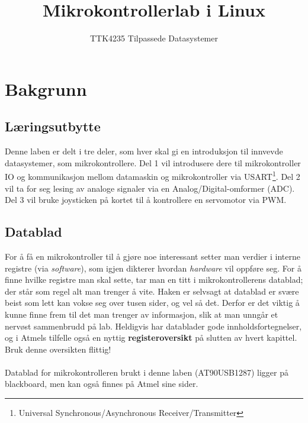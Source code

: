 \documentclass[11pt,a4paper]{article}
\title{Mikrokontrollerlab i Linux}
\author{TTK4235 Tilpassede Datasystemer}
\date{}
\def\e_learn_platform{blackboard}
\begin{document}
\maketitle
\section{Bakgrunn}
\subsection{Læringsutbytte}
Denne laben er delt i tre deler, som hver skal gi en introduksjon til innvevde datasystemer, som mikrokontrollere. Del 1 vil introdusere dere til mikrokontroller IO og kommunikasjon mellom datamaskin og mikrokontroller via USART\footnote{Universal Synchronous/Asynchronous Receiver/Transmitter}. Del 2 vil ta for seg lesing av analoge signaler via en Analog/Digital-omformer (ADC). Del 3 vil bruke joysticken på kortet til å kontrollere en servomotor via PWM.

\subsection{Datablad}
For å få en mikrokontroller til å gjøre noe interessant setter man verdier i interne registre (via \textit{software}), som igjen dikterer hvordan \textit{hardware} vil oppføre seg. For å finne hvilke registre man skal sette, tar man en titt i mikrokontrollerens datablad; der står som regel alt man trenger å vite. Haken er selvsagt at datablad er svære beist som lett kan vokse seg over tusen sider, og vel så det. Derfor er det viktig å kunne finne frem til det man trenger av informasjon, slik at man unngår et nervøst sammenbrudd på lab. Heldigvis har datablader gode innholdsfortegnelser, og i Atmels tilfelle også en nyttig \textbf{registeroversikt} på slutten av hvert kapittel. Bruk denne oversikten flittig!\\
\\
Datablad for mikrokontrolleren brukt i denne laben (AT90USB1287) ligger på \e_learn_platform, men kan også finnes på Atmel sine sider.
\end{document}
